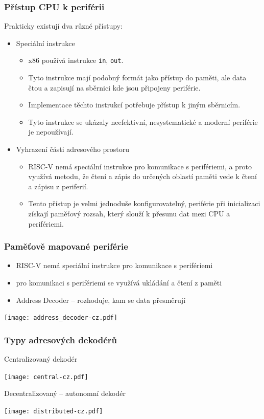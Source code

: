 \documentclass{beamer}
\begin{document}
\begin{frame}
\frametitle{Přístup CPU k periférii}

Prakticky existují dva různé přístupy:
\begin{itemize}
\item Speciální instrukce 
\begin{itemize}
\item x86 používá instrukce \texttt{in}, \texttt{out}.
\item Tyto instrukce mají podobný formát jako přístup do paměti, ale data čtou a zapisují na sběrnici kde jsou připojeny periférie.
\item Implementace těchto instrukcí potřebuje přístup k jiným sběrnicím.
\item Tyto instrukce se ukázaly neefektivní, nesystematické a moderní periférie je nepoužívají.
\end{itemize}
\item Vyhrazení části adresového prostoru
\begin{itemize}
\item RISC-V nemá speciální instrukce pro komunikace s perifériemi, a proto využívá metodu, že čtení a zápis do určených oblastí paměti vede k čtení a zápisu z periferií.
\item Tento přístup je velmi jednoduše konfigurovatelný, periférie při inicializaci získají paměťový rozsah, který slouží k přesunu dat mezi CPU a perifériemi.
\end{itemize}
\end{itemize}
\end{frame}


\begin{frame}
\frametitle{Paměťově mapované periférie}

\begin{itemize}
\item RISC-V nemá speciální instrukce pro komunikace s perifériemi
\item pro komunikaci s perifériemi se využívá ukládání a čtení z paměti
\item Address Decoder -- rozhoduje, kam se data přesměrují
\end{itemize}
\begin{center}
\texttt{[image: address\_decoder-cz.pdf]}
\end{center}
\end{frame}


\begin{frame}
\frametitle{Typy adresových dekodérů}

Centralizovaný dekodér

\begin{center}
\texttt{[image: central-cz.pdf]}
\end{center}

Decentralizovaný -- autonomní dekodér

\begin{center}
\texttt{[image: distributed-cz.pdf]}
\end{center}
\end{frame}
\end{document}
